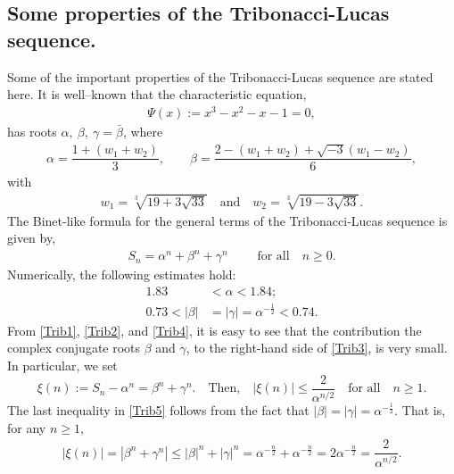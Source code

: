 \documentclass[10pt,a4paper]{article}
\begin{document}
\subsection{Some properties of the Tribonacci-Lucas sequence.}
Some of the important properties of the Tribonacci-Lucas sequence are stated here. It is well--known that the characteristic equation,
\begin{align*}
 \Psi(x):=x^3-x^2-x-1=0,
\end{align*}
has roots $ \alpha, ~\beta,~ \gamma = \bar{\beta} $, where
\begin{eqnarray}\label{Trib1}
\alpha =\dfrac{1+(w_1+w_2)}{3}, \qquad \beta = \dfrac{2-(w_1+w_2)+\sqrt{-3}(w_1-w_2)}{6},
\end{eqnarray}
with
\begin{eqnarray}\label{Trib2}
w_1=\sqrt[3]{19+3\sqrt{33}} \quad \text{and}\quad w_2=\sqrt[3]{19-3\sqrt{33}}.
\end{eqnarray}
The Binet-like formula for the general terms of the Tribonacci-Lucas sequence is given by,
\begin{eqnarray}\label{Trib3}
S_n = \alpha^{n}+\beta^{n}+\gamma^{n} \qquad \text{ for all} \quad n\ge 0.
\end{eqnarray}
\noindent 
Numerically, the following estimates hold:
\begin{equation}\label{Trib4}
\begin{aligned}
1.83&<\alpha<1.84;\\
0.73 < |\beta|&=|\gamma|=\alpha^{-\frac{1}{2}}< 0.74.
\end{aligned}
\end{equation}
\noindent
From \eqref{Trib1}, \eqref{Trib2}, and \eqref{Trib4}, it is easy to see that the contribution the complex conjugate roots $ \beta $ and $ \gamma $, to the right-hand side of \eqref{Trib3}, is very small. In particular, we set
\begin{equation}\label{Trib5}
\xi(n) := S_n -  \alpha^n =  \beta^n + \gamma^n. \quad \text{Then,} \quad |\xi(n)| \le  \frac{2}{\alpha^{n/2}} \quad \text{for all} \quad n \geq 1.
\end{equation}
The last inequality in \eqref{Trib5} follows from the fact that $ |\beta|=|\gamma|=\alpha^{-\frac{1}{2}} $. That is, for any $ n\ge 1 $,
\begin{align*}
|\xi (n)|=\left|\beta^{n}+\gamma^{n}\right| \le |\beta|^{n}+ |\gamma|^{n}= \alpha^{-\frac{n}{2}}+ \alpha^{-\frac{n}{2}} = 2 \alpha^{-\frac{n}{2}} = \dfrac{2}{\alpha^{n/2}}.
\end{align*}
\end{document}
